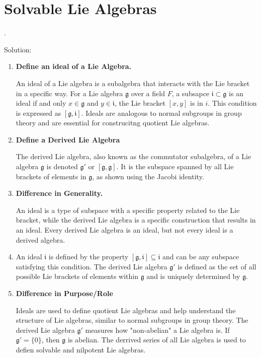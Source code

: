 \documentclass[12pt,a4paper]{report}
\begin{document}
\chapter{Solvable Lie Algebras}

\begin{remark}.

\noindent
Solution:
\begin{enumerate}[label=Step \arabic*:]
	\item \textbf{Define an ideal of a Lie Algebra.}
	
	An ideal of a Lie algebra is a subalgebra that interacts with the Lie bracket in a specific way.  For a Lie algebra $\mathfrak{g}$ over a field $F$, a subsapce $\mathfrak{i} \subset \mathfrak{g}$ is an ideal if and only $x \in \mathfrak{g}$ and $y \in \mathfrak{i}$, the Lie bracket $[x,y]$ is in $i$.  This condition is expressed as $[\mathfrak{g}, \mathfrak{i}]$.  Ideals are analogous to normal subgroups in group theory and are essential for construcitng quotient Lie algebras.
	
	\item \textbf{Define a Derived Lie Algebra}
	
	The derived Lie algebra, also known as the commutator subalgebra, of a Lie algebra $\mathfrak{g}$ is denoted $\mathfrak{g}'$ or $[\mathfrak{g}, \mathfrak{g}]$.  It is the subspace spanned by all Lie brackets of elements in $\mathfrak{g}$, as shown using the Jacobi identity.
	
	\item \textbf{Difference in Generality.}
	
	An ideal is a type of subspace with a specific property related to the Lie bracket, while the derived Lie algebra is a specific construction that results in an ideal.  Every derived Lie algebra is an ideal, but not every ideal is a derived algebra.
	
	\item An ideal $\mathfrak{i}$ is defined by the property $[\mathfrak{g},\mathfrak{i}] \subseteq \mathfrak{i}$ and can be any subspace satisfying this condition.  The derived Lie algebra $\mathfrak{g}'$ is defined as the set of all possible Lie brackets of elements within $\mathfrak{g}$ and is uniquely determined by $\mathfrak{g}$.
	
	\item \textbf{Difference in Purpose/Role}
	
	Ideals are used to define quotient Lie algebras and help understand the structure of Lie algebras,  similar to normal subgroups in group theory.  The derived Lie algebra $\mathfrak{g}'$ measures how "non-abelian" a Lie algebra is.  If $\mathfrak{g}'=\{0\}$, then $\mathfrak{g}$ is abelian.  The derrived series of all Lie algebra is used to defien solvable and nilpotent Lie algebras.
	

\end{enumerate}
\end{remark}
\end{document}
